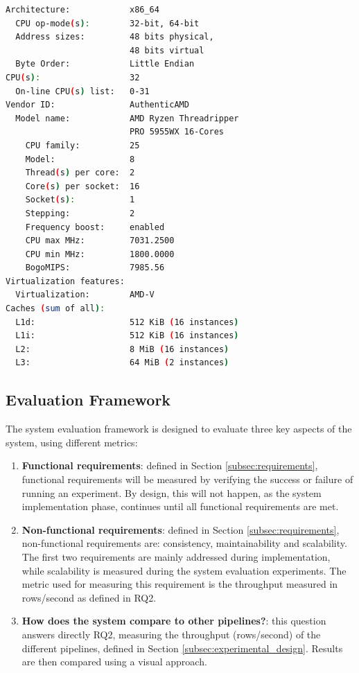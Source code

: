\begin{lstlisting}[language=bash, caption={[Experimental environment details]Output of a \textit{lscpu} bash command in the experimental environment.}, label={lst:cpu_snurran}, frame=tb]
Architecture:            x86_64
  CPU op-mode(s):        32-bit, 64-bit
  Address sizes:         48 bits physical, 
                         48 bits virtual
  Byte Order:            Little Endian
CPU(s):                  32
  On-line CPU(s) list:   0-31
Vendor ID:               AuthenticAMD
  Model name:            AMD Ryzen Threadripper 
                         PRO 5955WX 16-Cores
    CPU family:          25
    Model:               8
    Thread(s) per core:  2
    Core(s) per socket:  16
    Socket(s):           1
    Stepping:            2
    Frequency boost:     enabled
    CPU max MHz:         7031.2500
    CPU min MHz:         1800.0000
    BogoMIPS:            7985.56
Virtualization features: 
  Virtualization:        AMD-V
Caches (sum of all):     
  L1d:                   512 KiB (16 instances)
  L1i:                   512 KiB (16 instances)
  L2:                    8 MiB (16 instances)
  L3:                    64 MiB (2 instances)
\end{lstlisting}

\subsection{Evaluation Framework}
%

The system evaluation framework is designed to evaluate three key aspects of the system, using different metrics:
\begin{enumerate}
    \item \textbf{Functional requirements}: defined in Section \ref{subsec:requirements}, functional requirements will be measured by verifying the success or failure of running an experiment. By design, this will not happen, as the system implementation phase, continues until all functional requirements are met.
    \item \textbf{Non-functional requirements}: defined in Section \ref{subsec:requirements}, non-functional requirements are: consistency, maintainability and scalability. The first two requirements are mainly addressed during implementation, while scalability is measured during the system evaluation experiments. The metric used for measuring this requirement is the throughput measured in rows/second as defined in RQ2.
    \item \textbf{How does the system compare to other pipelines?}: this question answers directly RQ2, measuring the throughput (rows/second) of the different pipelines, defined in Section \ref{subsec:experimental_design}. Results are then compared using a visual approach.
\end{enumerate} 


